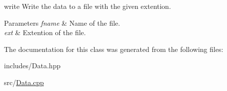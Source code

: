 write Write the data to a file with the given extention. 


\begin{DoxyParams}{Parameters}
{\em fname} & Name of the file. \\
\hline
{\em ext} & Extention of the file. \\
\hline
\end{DoxyParams}


The documentation for this class was generated from the following files\+:\begin{DoxyCompactItemize}
\item 
includes/Data.\+hpp\item 
src/\hyperlink{_data_8cpp}{Data.\+cpp}\end{DoxyCompactItemize}
